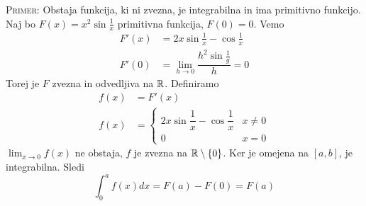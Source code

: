 \textsc{Primer:} Obstaja funkcija, ki ni zvezna, je integrabilna in ima primitivno funkcijo.
Naj bo $F(x) = x^2 \sin \frac{1}{x}$ primitivna funkcija, $F(0) = 0$. Vemo
\begin{align*}
F'(x) &= 2 x \sin \frac{1}{x} - \cos \frac{1}{x} \\
F'(0) &= \lim_{h \to 0} \dfrac{h^2 \sin \frac{1}{g}}{h} = 0
\end{align*}
Torej je $F$ zvezna in odvedljiva na $\mathbb{R}$. Definiramo
\begin{align*}
f(x) &= F'(x) \\
f(x) &= \begin{cases}
2x \sin \dfrac{1}{x} - \cos \dfrac{1}{x} & x \neq 0 \\
0 & x = 0
\end{cases}
\end{align*}
$\lim_{x \to 0} f(x)$ ne obstaja, $f$ je zvezna na $\mathbb{R} \setminus \{0\}$. Ker je omejena na $[a, b]$, je integrabilna. Sledi
\begin{equation*}
\int_{0}^{a} f(x) dx = F(a) - F(0) = F(a)
\end{equation*}
%
